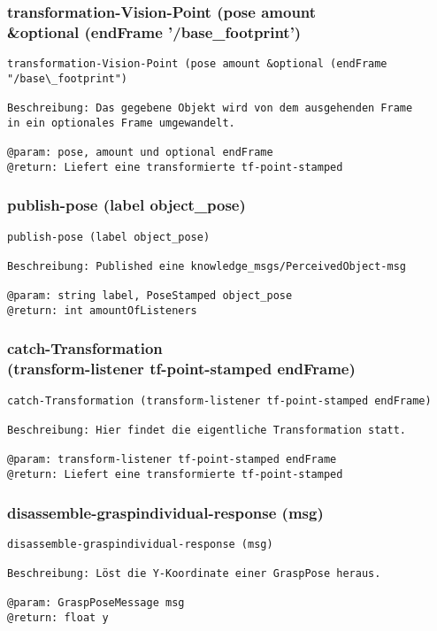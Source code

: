 \documentclass{suturo}
\begin{document}
\subsubsection{transformation-Vision-Point (pose amount\\
\&optional (endFrame '/base\_footprint')}
\begin{verbatim}
transformation-Vision-Point (pose amount &optional (endFrame "/base\_footprint")

Beschreibung: Das gegebene Objekt wird von dem ausgehenden Frame
in ein optionales Frame umgewandelt.

@param: pose, amount und optional endFrame
@return: Liefert eine transformierte tf-point-stamped
\end{verbatim}


\subsubsection{publish-pose (label object\_pose)}
\begin{verbatim}
publish-pose (label object_pose)

Beschreibung: Published eine knowledge_msgs/PerceivedObject-msg

@param: string label, PoseStamped object_pose
@return: int amountOfListeners
\end{verbatim}

\subsubsection{catch-Transformation \\
(transform-listener tf-point-stamped endFrame)}
\begin{verbatim}
catch-Transformation (transform-listener tf-point-stamped endFrame)

Beschreibung: Hier findet die eigentliche Transformation statt.

@param: transform-listener tf-point-stamped endFrame
@return: Liefert eine transformierte tf-point-stamped
\end{verbatim}

\subsubsection{disassemble-graspindividual-response (msg)}
\begin{verbatim}
disassemble-graspindividual-response (msg)

Beschreibung: Löst die Y-Koordinate einer GraspPose heraus.

@param: GraspPoseMessage msg
@return: float y
\end{verbatim}
\end{document}
